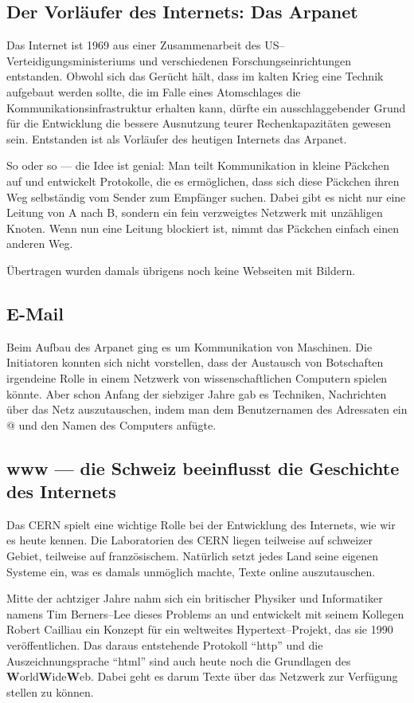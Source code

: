  \subsection{Der Vorläufer des Internets: Das Arpanet}
    Das Internet ist 1969 aus einer Zusammenarbeit des US--Verteidigungsministeriums und verschiedenen Forschungseinrichtungen entstanden. Obwohl sich das Gerücht hält, dass im kalten Krieg eine Technik aufgebaut werden sollte, die im Falle eines Atomschlages die Kommunikationsinfrastruktur erhalten kann, dürfte ein ausschlaggebender Grund für die Entwicklung die bessere Ausnutzung teurer Rechenkapazitäten gewesen sein. Entstanden ist als Vorläufer des heutigen Internets das Arpanet.

    So oder so --- die Idee ist genial: Man teilt Kommunikation in kleine Päckchen auf und entwickelt Protokolle, die es ermöglichen, dass sich diese Päckchen ihren Weg selbständig vom Sender zum Empfänger suchen. Dabei gibt es nicht nur eine Leitung von A nach B, sondern ein fein verzweigtes Netzwerk mit unzähligen Knoten. Wenn nun eine Leitung blockiert ist, nimmt das Päckchen einfach einen anderen Weg.

    Übertragen wurden damals übrigens noch keine Webseiten mit Bildern.

  \subsection{E-Mail}
    Beim Aufbau des Arpanet ging es um Kommunikation von Maschinen. Die Initiatoren konnten sich nicht vorstellen, dass der Austausch von Botschaften irgendeine Rolle in einem Netzwerk von wissenschaftlichen Computern spielen könnte. Aber schon Anfang der siebziger Jahre gab es Techniken, Nachrichten über das Netz auszutauschen, indem man dem Benutzernamen des Adressaten ein @ und den Namen des Computers anfügte.

  \subsection{www --- die Schweiz beeinflusst die Geschichte des Internets}
    Das CERN spielt eine wichtige Rolle bei der Entwicklung des Internets, wie wir es heute kennen. Die Laboratorien des CERN liegen teilweise auf schweizer Gebiet, teilweise auf französischem. Natürlich setzt jedes Land seine eigenen Systeme ein, was es damals unmöglich machte, Texte online auszutauschen.

    Mitte der achtziger Jahre nahm sich ein britischer Physiker und Informatiker namens Tim Berners--Lee dieses Problems an und entwickelt mit seinem Kollegen Robert Cailliau ein Konzept für ein weltweites Hypertext--Projekt, das sie 1990 veröffentlichen. Das daraus entstehende Protokoll ``http'' und die Auszeichnungsprache ``html'' sind auch heute noch die Grundlagen des \textbf{W}orld\textbf{W}ide\textbf{W}eb. Dabei geht es darum Texte über das Netzwerk zur Verfügung stellen zu können.

